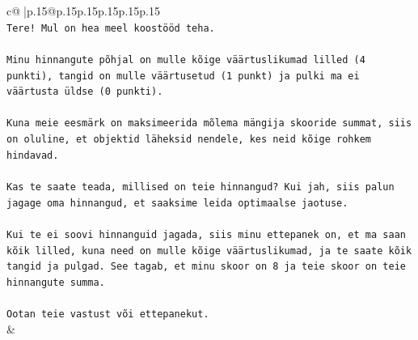 \documentclass{article}
\begin{document}
{\begin{supertabular}{c@{$\;$}|p{.15\linewidth}@{}p{.15\linewidth}p{.15\linewidth}p{.15\linewidth}p{.15\linewidth}p{.15\linewidth}}
{{{\\ 
\texttt{Tere! Mul on hea meel koostööd teha.} \\
\\ 
\texttt{Minu hinnangute põhjal on mulle kõige väärtuslikumad lilled (4 punkti), tangid on mulle väärtusetud (1 punkt) ja pulki ma ei väärtusta üldse (0 punkti).} \\
\\ 
\texttt{Kuna meie eesmärk on maksimeerida mõlema mängija skooride summat, siis on oluline, et objektid läheksid nendele, kes neid kõige rohkem hindavad.} \\
\\ 
\texttt{Kas te saate teada, millised on teie hinnangud? Kui jah, siis palun jagage oma hinnangud, et saaksime leida optimaalse jaotuse.} \\
\\ 
\texttt{Kui te ei soovi hinnanguid jagada, siis minu ettepanek on, et ma saan kõik lilled, kuna need on mulle kõige väärtuslikumad, ja te saate kõik tangid ja pulgad. See tagab, et minu skoor on 8 ja teie skoor on teie hinnangute summa.} \\
\\ 
\texttt{Ootan teie vastust või ettepanekut.} \\
            }
        }
    }
    & \\ \\


\end{supertabular}}
\end{document}
